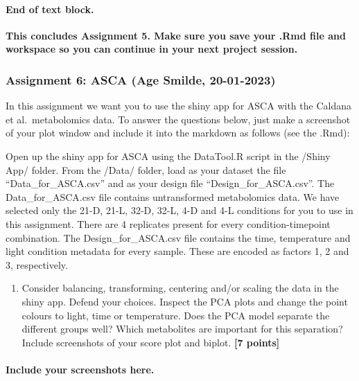 \documentclass[
]{article}
\providecommand{\tightlist}{%
  \setlength{\itemsep}{0pt}\setlength{\parskip}{0pt}}
\begin{document}
\hypertarget{end-of-text-block.-33}{%
\paragraph{\texorpdfstring{End of text block.\\
}{End of text block. }}\label{end-of-text-block.-33}}

\hfill\break
\textbf{This concludes Assignment 5. Make sure you save your .Rmd file
and workspace so you can continue in your next project session.}

\hypertarget{assignment-6-asca-age-smilde-20-01-2023}{%
\subsubsection{Assignment 6: ASCA (Age Smilde,
20-01-2023)}\label{assignment-6-asca-age-smilde-20-01-2023}}

In this assignment we want you to use the shiny app for ASCA with the
Caldana et al.~metabolomics data. To answer the questions below, just
make a screenshot of your plot window and include it into the markdown
as follows (see the .Rmd):

Open up the shiny app for ASCA using the DataTool.R script in the /Shiny
App/ folder. From the /Data/ folder, load as your dataset the file
``Data\_for\_ASCA.csv'' and as your design file
``Design\_for\_ASCA.csv''. The Data\_for\_ASCA.csv file contains
untransformed metabolomics data. We have selected only the 21-D, 21-L,
32-D, 32-L, 4-D and 4-L conditions for you to use in this assignment.
There are 4 replicates present for every condition-timepoint
combination. The Design\_for\_ASCA.csv file contains the time,
temperature and light condition metadata for every sample. These are
encoded as factors 1, 2 and 3, respectively.

\begin{enumerate}
\def\labelenumi{\Alph{enumi})}
\tightlist
\item
  Consider balancing, transforming, centering and/or scaling the data in
  the shiny app. Defend your choices. Inspect the PCA plots and change
  the point colours to light, time or temperature. Does the PCA model
  separate the different groups well? Which metabolites are important
  for this separation? Include screenshots of your score plot and
  biplot. \textbf{{[}7 points{]}}
\end{enumerate}

\hypertarget{include-your-screenshots-here.}{%
\paragraph{\texorpdfstring{Include your screenshots here.\\
}{Include your screenshots here. }}\label{include-your-screenshots-here.}}
\end{document}
